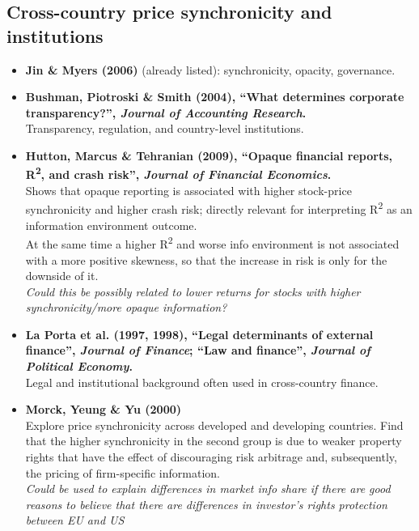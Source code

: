 \documentclass[11pt,a4paper]{article}
\begin{document}
\subsection{Cross-country price synchronicity and institutions}

\begin{itemize}
  \item \textbf{Jin \& Myers (2006)} (already listed): synchronicity, opacity, governance.

  \item \textbf{Bushman, Piotroski \& Smith (2004), ``What determines corporate transparency?'', \emph{Journal of Accounting Research}.}\\
  Transparency, regulation, and country-level institutions.

  \item \textbf{Hutton, Marcus \& Tehranian (2009), ``Opaque financial reports, R\textsuperscript{2}, and crash risk'', \emph{Journal of Financial Economics}.}\\
  Shows that opaque reporting is associated with higher stock-price synchronicity and higher crash risk; directly relevant for interpreting R\textsuperscript{2} as an information environment outcome.\\
  At the same time a higher R\textsuperscript{2} and worse info environment is not associated with a more positive skewness, so that the increase in risk is only for the downside of it.\\
  \textit{Could this be possibly related to lower returns for stocks with higher synchronicity/more opaque information?}

  \item \textbf{La Porta et al. (1997, 1998), ``Legal determinants of external finance'', \emph{Journal of Finance}; ``Law and finance'', \emph{Journal of Political Economy}.}\\
  Legal and institutional background often used in cross-country finance.

  \item \textbf{Morck, Yeung \& Yu (2000)}\\
  Explore price synchronicity across developed and developing countries. Find that the higher synchronicity in the second group is due to weaker property rights that have the effect of discouraging risk arbitrage and, subsequently, the pricing of firm-specific information.\\
  \textit{Could be used to explain differences in market info share if there are good reasons to believe that there are differences in investor's rights protection between EU and US}
\end{itemize}
\end{document}
